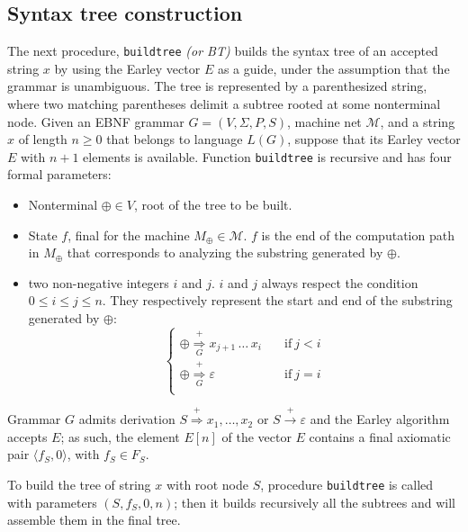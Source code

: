 \subsection{Syntax tree construction}
The next procedure, \texttt{buildtree} \textit{(or BT)} builds the syntax tree of an accepted string $x$ by using the Earley vector $E$ as a guide, under the assumption that the grammar is unambiguous.
The tree is represented by a parenthesized string, where two matching parentheses delimit a subtree rooted at some nonterminal node.
Given an EBNF grammar $G = \left( V, \Sigma, P, S \right)$, machine net $\mathcal{M}$, and a string $x$ of length $n \geq 0$ that belongs to language $L(G)$, suppose that its Earley vector $E$ with $n+1$ elements is available.
Function \texttt{buildtree} is recursive and has four formal parameters:

\begin{itemize}
  \item Nonterminal $\oplus \in V$, root of the tree to be built.
  \item State $f$, final for the machine $M_\oplus \in \mathcal{M}$. 
      $f$ is the end of the computation path in $M_\oplus$ that corresponds to analyzing the substring generated by $\oplus$. 
  \item two non-negative integers $i$ and $j$. 
      $i$ and $j$ always respect the condition $0 \leq i \leq j \leq n$. 
      They respectively represent the start and end of the substring generated by $\oplus$: 
      \[ \begin{cases}
          \oplus \overset{+}{\underset{G}{\Rightarrow}} x_{j+1} \,\ldots\, x_i \quad & \text{if} \ j < i \\[1.5ex]
          \oplus \overset{+}{\underset{G}{\Rightarrow}} \varepsilon \quad            & \text{if} \ j = i \\
        \end{cases}  
        \]
\end{itemize}

Grammar $G$ admits derivation $S \overset{+}{\Rightarrow} x_1, \dots, x_2$ or $S \overset{+}{\rightarrow} \varepsilon$ and the Earley algorithm accepts $E$;
as such, the element $E[n]$ of the vector $E$ contains a final axiomatic pair $\langle f_S, 0 \rangle$, with $f_S \in F_S$.

To build the tree of string $x$ with root node $S$, procedure \texttt{buildtree} is called with parameters $(S, f_S, 0, n)$;
then it builds recursively all the subtrees and will assemble them in the final tree.

